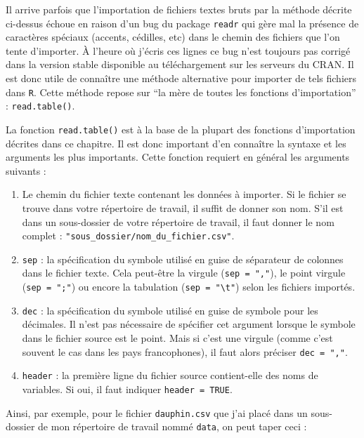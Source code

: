 \documentclass[
  a4paper,
  DIV=11,
  numbers=noendperiod,
  oneside]{scrreprt}
\providecommand{\tightlist}{%
  \setlength{\itemsep}{0pt}\setlength{\parskip}{0pt}}\usepackage{longtable,booktabs,array}
\begin{document}
Il arrive parfois que l'importation de fichiers textes bruts par la
méthode décrite ci-dessus échoue en raison d'un bug du package
\texttt{readr} qui gère mal la présence de caractères spéciaux (accents,
cédilles, etc) dans le chemin des fichiers que l'on tente d'importer. À
l'heure où j'écris ces lignes ce bug n'est toujours pas corrigé dans la
version stable disponible au téléchargement sur les serveurs du CRAN. Il
est donc utile de connaître une méthode alternative pour importer de
tels fichiers dans \texttt{R}. Cette méthode repose sur ``la mère de
toutes les fonctions d'importation'' : \texttt{read.table()}.

La fonction \texttt{read.table()} est à la base de la plupart des
fonctions d'importation décrites dans ce chapitre. Il est donc important
d'en connaître la syntaxe et les arguments les plus importants. Cette
fonction requiert en général les arguments suivants :

\begin{enumerate}
\def\labelenumi{\arabic{enumi}.}
\tightlist
\item
  Le chemin du fichier texte contenant les données à importer. Si le
  fichier se trouve dans votre répertoire de travail, il suffit de
  donner son nom. S'il est dans un sous-dossier de votre répertoire de
  travail, il faut donner le nom complet :
  \texttt{"sous\_dossier/nom\_du\_fichier.csv"}.
\item
  \texttt{sep} : la spécification du symbole utilisé en guise de
  séparateur de colonnes dans le fichier texte. Cela peut-être la
  virgule (\texttt{sep\ =\ ","}), le point virgule
  (\texttt{sep\ =\ ";"}) ou encore la tabulation
  (\texttt{sep\ =\ "\textbackslash{}t"}) selon les fichiers importés.
\item
  \texttt{dec} : la spécification du symbole utilisé en guise de symbole
  pour les décimales. Il n'est pas nécessaire de spécifier cet argument
  lorsque le symbole dans le fichier source est le point. Mais si c'est
  une virgule (comme c'est souvent le cas dans les pays francophones),
  il faut alors préciser \texttt{dec\ =\ ","}.
\item
  \texttt{header} : la première ligne du fichier source contient-elle
  des noms de variables. Si oui, il faut indiquer
  \texttt{header\ =\ TRUE}.
\end{enumerate}

Ainsi, par exemple, pour le fichier \texttt{dauphin.csv} que j'ai placé
dans un sous-dossier de mon répertoire de travail nommé \texttt{data},
on peut taper ceci :
\end{document}
